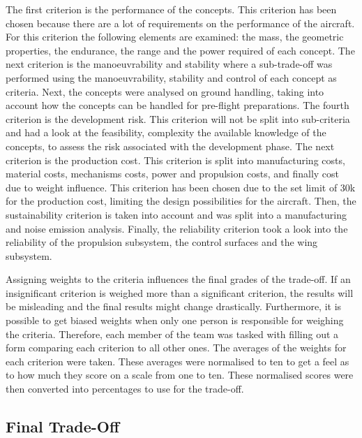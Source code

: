The first criterion is the performance of the concepts. This criterion has been chosen because there are a lot of requirements on the performance of the aircraft. For this criterion the following elements are examined: the mass, the geometric properties, the endurance, the range and the power required of each concept. The next criterion is the manoeuvrability and stability where a sub-trade-off was performed using the manoeuvrability, stability and control of each concept as criteria. Next, the concepts were analysed on ground handling, taking into account how the concepts can be handled for pre-flight preparations. The fourth criterion is the development risk. This criterion will not be split into sub-criteria and had a look at the feasibility, complexity the available knowledge of the concepts, to assess the risk associated with the development phase. The next criterion is the production cost. This criterion is split into manufacturing costs, material costs, mechanisms costs, power and propulsion costs, and finally cost due to weight influence. This criterion has been chosen due to the set limit of 30k for the production cost, limiting the design  possibilities for the aircraft. Then, the sustainability criterion is taken into account and was split into a manufacturing and noise emission analysis. Finally, the reliability criterion took a look into the reliability of the propulsion subsystem, the control surfaces and the wing subsystem.

Assigning weights to the criteria influences the final grades of the trade-off. If an insignificant criterion is weighed more than a significant criterion, the results will be misleading and the final results might change drastically. Furthermore, it is possible to get biased weights when only one person is responsible for weighing the criteria. Therefore, each member of the team was tasked with filling out a form comparing each criterion to all other ones. The averages of the weights for each criterion were taken. These averages were normalised to ten to get a feel as to how much they score on a scale from one to ten. These normalised scores were then converted into percentages to use for the trade-off. 


\subsection{Final Trade-Off}
\label{sec:fina_trad}

